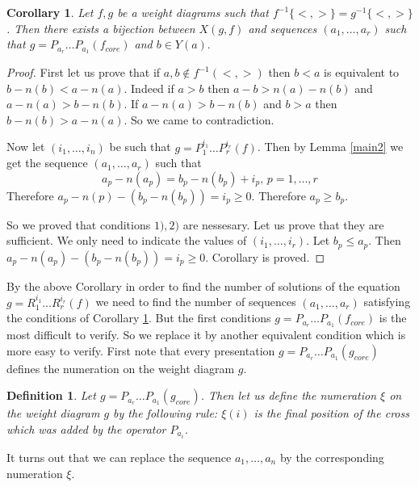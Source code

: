\documentclass[12pt,reqno]{amsart}
\newtheorem{corollary}[thm]{Corollary}
\newtheorem{definition}[thm]{Definition}
\begin{document}
\begin{corollary}\label{cor}  Let $f,g$ be a weight diagrams such that  $f^{-1}\{<,>\}=g^{-1}\{<,>\}$. Then there  exists a bijection between $X(g,f)$ 
and sequences $(a_1,\dots,a_r)$ such that  $g=P_{a_r}\dots P_{a_1}(f_{core})$ and   $b\in Y(a).$


\end{corollary}
\begin{proof} 
First let us prove that if $a,b\notin f^{-1}(<,>)$ then $b<a$ is equivalent to $b-n(b)<a-n(a)$. Indeed if $a>b$ then $a-b>n(a)-n(b)$ and $a-n(a)>b-n(b)$. If  $a-n(a)>b-n(b)$ and $b>a$ then $b-n(b)>a-n(a)$. So we came to contradiction.

Now  let  $(i_1,\dots,i_n)$  be such that $g=P_1^{i_1}\dots P_r^{i_r}(f)$. Then by   Lemma \ref{main2}  we get the sequence   $(a_1,\dots,a_r)$ such that
 $$
 a_p-n(a_p)=b_p-n(b_p)+i_p,\,p=1,\dots,r
 $$
 Therefore $a_p-n(p)-(b_p-n(b_p))=i_p\ge 0$. Therefore $a_p\ge b_p$.

 So we proved that conditions $1),2)$ are nessesary. Let us prove that they are sufficient. We only need to indicate the values of $(i_1,\dots,i_r)$. Let $b_p\le a_p$. Then  $a_p-n(a_p)-(b_p-n(b_p))=i_p\ge0$. Corollary is proved.
\end{proof}


By  the above Corollary in  order  to find the  number of solutions of the equation  $g=R_1^{i_1}\dots R_r^{i_r}(f)$  we need to find the number of sequences $(a_1,\dots,a_r)$ satisfying the conditions of  Corollary \ref{cor}. But the first conditions   $g=P_{a_r}\dots P_{a_1}(f_{core})$ is the most difficult to verify. So we replace it by another equivalent condition which is more easy to verify. First note that every presentation $g=P_{a_r}\dots P_{a_1}(g_{core})$  defines the numeration on the weight diagram $g$.


\begin{definition} Let $g=P_{a_r}\dots P_{a_1}(g_{core})$.  Then let us  define the numeration $\xi$ on the weight diagram $g$ by the following rule: $\xi(i)$ is the final position of the cross which was added by  the operator $P_{a_i}$.
\end{definition}

It turns out that we can replace  the sequence  $a_1,\dots, a_n$  by the corresponding numeration $\xi$.
\end{document}
